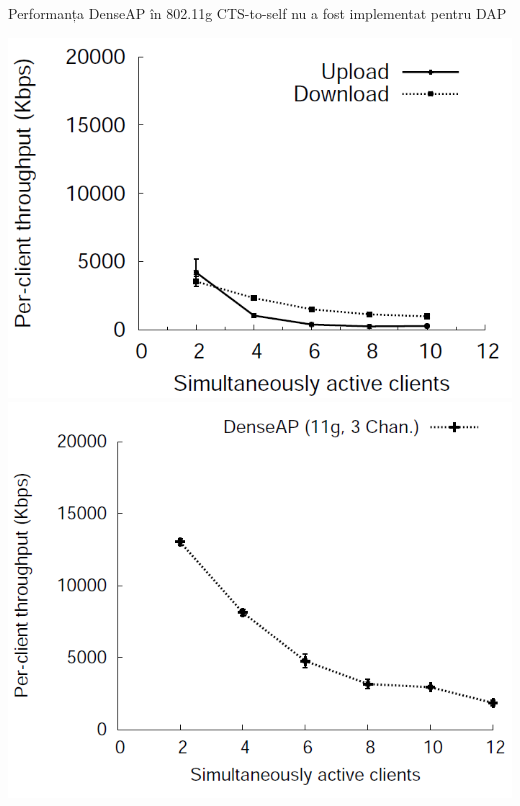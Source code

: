 \begin{frame}{Performanța DenseAP în 802.11g}
  CTS-to-self nu a fost implementat pentru DAP
  \begin{center}
    \includegraphics[scale=0.21]{img/fig9.png}
    \includegraphics[scale=0.21]{img/fig11.png}
  \end{center}
\end{frame}

